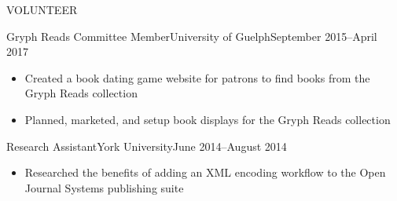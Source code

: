 \documentclass[]{mcdowellcv}
\begin{document}
	
	\begin{cvsection}{VOLUNTEER}

        \begin{cvsubsection}{Gryph Reads Committee Member}{University of Guelph}{September 2015--April 2017}
			\begin{itemize}
				\item Created a book dating game website for patrons to find books from the Gryph Reads collection
				\item Planned, marketed, and setup book displays for the Gryph Reads collection
			\end{itemize}
		\end{cvsubsection}


        \begin{cvsubsection}{Research Assistant}{York University}{June 2014--August 2014}
			\begin{itemize}
				\item Researched the benefits of adding an XML encoding workflow to the Open Journal Systems publishing suite
			\end{itemize}
		\end{cvsubsection}
	\end{cvsection}
	
\end{document}
